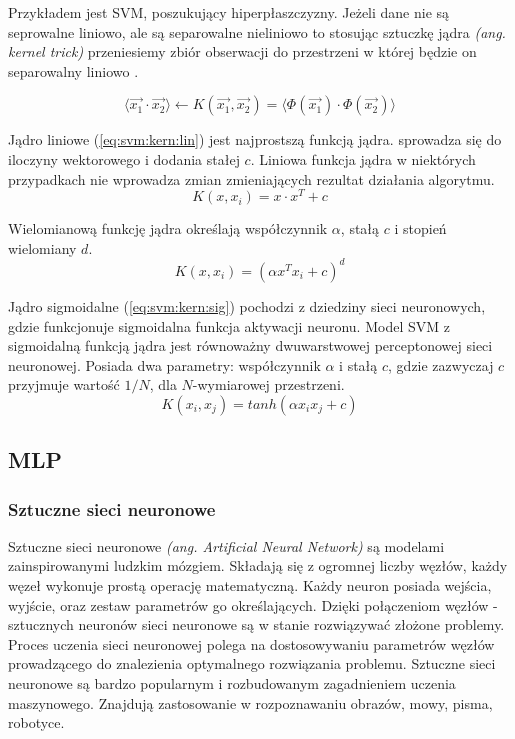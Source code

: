 \documentclass[a4paper,12pt,twoside,openany]{report}
\newcommand{\ang}[1]{\textit{(ang. #1)}}
\newcommand{\Eq}[1]{(\ref{#1})}
\begin{document}
Przykładem jest SVM, poszukujący hiperpłaszczyzny.
Jeżeli dane nie są seprowalne liniowo,
ale są separowalne nieliniowo to stosując sztuczkę jądra \ang{kernel trick} 
przeniesiemy zbiór obserwacji do przestrzeni w której będzie on separowalny liniowo \cite{Patle2013}.

\begin{equation}
	\langle \vec{x_1} \cdot \vec{x_2} \rangle \gets K(\vec{x_1}, \vec{x_2}) = \langle \Phi(\vec{x_1}) \cdot \Phi(\vec{x_2}) \rangle
\end{equation}

Jądro liniowe \Eq{eq:svm:kern:lin} jest najprostszą funkcją jądra. 
sprowadza się do iloczyny wektorowego i dodania stałej $c$.
Liniowa funkcja jądra w niektórych przypadkach nie wprowadza zmian zmieniających rezultat działania algorytmu.
\begin{equation}
	\label{eq:svm:kern:lin}
	K(x, x_i) = x \cdot x ^ T + c
\end{equation}

Wielomianową funkcję jądra określają współczynnik $\alpha$, stałą $c$ i stopień wielomiany $d$.
\begin{equation}
	\label{eq:svm:kern:poly}
	K(x, x_i) = (\alpha x^T x_i + c)^d 
\end{equation}

Jądro sigmoidalne \Eq{eq:svm:kern:sig} pochodzi z dziedziny sieci neuronowych,
gdzie funkcjonuje sigmoidalna funkcja aktywacji neuronu. 
Model SVM z sigmoidalną funkcją jądra jest równoważny dwuwarstwowej perceptonowej sieci neuronowej.
Posiada dwa parametry: współczynnik $\alpha$ i stałą $c$, gdzie zazwyczaj $c$ przyjmuje wartość $1/N$,
dla $N$-wymiarowej przestrzeni.
\begin{equation}
	\label{eq:svm:kern:sig}
	K(x_i, x_j) = tanh( \alpha x_i  x_j + c)
\end{equation}
\subsection{MLP}
\subsubsection{Sztuczne sieci neuronowe}
Sztuczne sieci neuronowe \ang{Artificial Neural Network} są modelami zainspirowanymi ludzkim mózgiem.
Składają się z ogromnej liczby węzłów, każdy węzeł wykonuje prostą operację matematyczną.
Każdy neuron posiada wejścia, wyjście, oraz zestaw parametrów go określających. 
Dzięki połączeniom węzłów - sztucznych neuronów sieci neuronowe są w stanie rozwiązywać złożone problemy.
Proces uczenia sieci neuronowej polega na dostosowywaniu parametrów węzłów prowadzącego do znalezienia optymalnego rozwiązania problemu.
Sztuczne sieci neuronowe są bardzo popularnym i rozbudowanym zagadnieniem uczenia maszynowego.
Znajdują zastosowanie w rozpoznawaniu obrazów, mowy, pisma, robotyce. 
\end{document}
